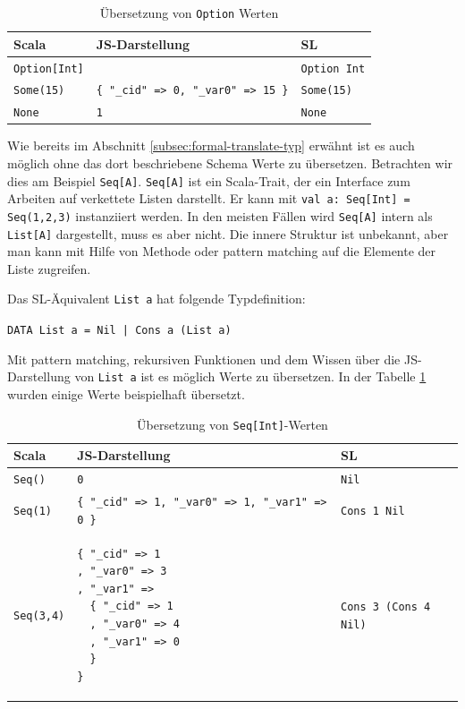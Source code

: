 \documentclass[12pt,bibtotoc]{scrreprt}
\begin{document}
\begin{table}[h]
\caption{Übersetzung von \lstinline!Option! Werten}
\centering
\begin{tabular}{lll}
Scala                   & JS-Darstellung                        & SL \\
\midrule
\lstinline!Option[Int]! &                                            & \lstinline!Option Int! \\
\lstinline!Some(15)!    & \lstinline!{ "_cid" => 0, "_var0" => 15 }! & \lstinline!Some(15)! \\
\lstinline!None!        & \lstinline!1!                              & \lstinline!None! \\
\end{tabular}
\end{table}

Wie bereits im Abschnitt \ref{subsec:formal-translate-typ} erwähnt ist es auch möglich ohne das dort beschriebene Schema Werte zu übersetzen. Betrachten wir dies am Beispiel \lstinline!Seq[A]!. \lstinline!Seq[A]! ist ein Scala-Trait, der ein Interface zum Arbeiten auf verkettete Listen darstellt. Er kann mit \lstinline!val a: Seq[Int] = Seq(1,2,3)! in­s­tan­zi­ie­rt werden. In den meisten Fällen wird \lstinline!Seq[A]! intern als \lstinline!List[A]! dargestellt, muss es aber nicht. Die innere Struktur ist unbekannt, aber man kann mit Hilfe von Methode oder pattern matching auf die Elemente der Liste zugreifen. 

Das SL-Äquivalent \lstinline!List a! hat folgende Typdefinition:

\begin{center}
\lstinline!DATA List a = Nil | Cons a (List a)!
\end{center}

Mit pattern matching, rekursiven Funktionen und dem Wissen über die JS-Darstellung von \lstinline!List a! ist es möglich Werte zu übersetzen. In der Tabelle \ref{tab:seq-int} wurden einige Werte beispielhaft übersetzt.

\lstset{basicstyle=\ttfamily\small, numbers=none}
\begin{table}[h]
\caption{Übersetzung von \lstinline!Seq[Int]!-Werten}
\centering
\begin{tabular}{lll}
Scala                & JS-Darstellung                        & SL \\
\midrule
\lstinline!Seq()!    & \lstinline!0! & \lstinline!Nil! \\
\lstinline!Seq(1)!   & \lstinline!{ "_cid" => 1, "_var0" => 1, "_var1" => 0 }!                              & \lstinline!Cons 1 Nil! \\
\lstinline!Seq(3,4)! & 
\begin{lstlisting}
{ "_cid" => 1
, "_var0" => 3
, "_var1" => 
  { "_cid" => 1
  , "_var0" => 4
  , "_var1" => 0
  }
}
\end{lstlisting} & \lstinline!Cons 3 (Cons 4 Nil)! \\
\end{tabular}
\label{tab:seq-int}
\end{table}
\lstset{basicstyle=\ttfamily\small, numbers=left, numberstyle=\tiny}
\end{document}
